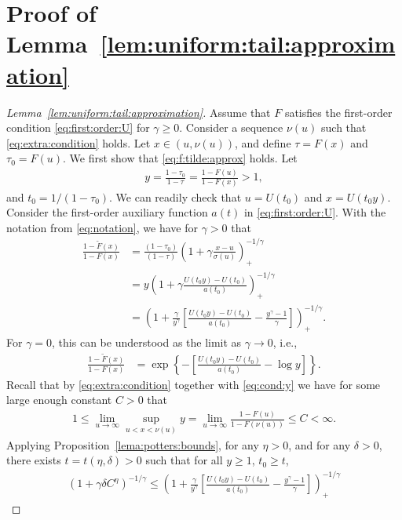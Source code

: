 \documentclass{statsoc}
\theoremstyle{break}
\newcommand{\tauzero}{\tau_0}
\newcommand{\tzero}{t_0}
\newcommand{\beam}{\begin{eqnarray}}
\newcommand{\eeam}{\end{eqnarray}\noindent}
\begin{document}
\section{Proof of Lemma~\ref{lem:uniform:tail:approximation} }\label{sec:proof:uniform:tail}	


\begin{proof}[Lemma~\ref{lem:uniform:tail:approximation}]
Assume that $F$ satisfies the first-order condition \eqref{eq:first:order:U} for $\gamma \geq  0$.
 Consider a sequence $\nu(u)$ such that \eqref{eq:extra:condition} holds.
 Let $ x\in (u,\nu(u))$, and define $\tau = F(x)$ and $\tauzero = F(u)$. We first show that \eqref{eq:f:tilde:approx} holds. Let
	\beam \label{eq:cond:y}
	y = \frac{1-\tauzero}{ 1-\tau}  = \frac{1-F(u)}{ 1-F(x) }   > 1,
	\eeam 
	and $\tzero = 1 / (1-\tauzero)$. We can readily check that $u = U(\tzero)$ and  $x = U(t_0 y)$.
	Consider the first-order auxiliary function $a(t)$ in \eqref{eq:first:order:U}. 
	With the notation from \eqref{eq:notation}, we have for $\gamma > 0$ that
	\begin{align*}
		\frac{1 - \tilde F(x) }{1-F(x)}  &=
		\frac{(1-\tauzero)}{(1-\tau)} \left(  1+  \gamma \frac{x - u }{ \sigma(u) } \right)_+^{-1/\gamma}\\
		&= y \left(  1+  \gamma \frac{ U(\tzero y) - U(\tzero)} { a(\tzero) } \right)_+^{-1/\gamma}\\
		&= \left(  1 + \frac{\gamma}{y^\gamma} \left[  \frac{ U(\tzero y) - U(\tzero)} { a(\tzero) } - \frac{y^\gamma - 1}{\gamma} \right] \right)_+^{-1/\gamma}.
 	\end{align*}
	For $\gamma = 0$, this can be understood as the limit as $\gamma \to 0$, i.e.,
	\begin{align*}
		\frac{1 - \tilde F(x) }{1-F(x)}  &= \exp \left\{- \left[  \frac{ U(\tzero y) - U(\tzero)} { a(\tzero) } - \log y \right]\right\}.
 	\end{align*}
 	Recall that by \eqref{eq:extra:condition}  together with \eqref{eq:cond:y} we have for some large enough constant $C>0$ that  
	\begin{align}\label{y_bound} 
	1 \leq \lim_{u \to \infty} \sup_{u < x < \nu(u)} y  =  \lim_{u \to \infty} \frac{1 - F(u)}{1-F(\nu(u)) } \leq C <  \infty.
	\end{align}
	Applying Proposition~\ref{lema:potters:bounds}, for any $\eta>0$, and for any $\delta >0$, there exists $t = t(\eta,\delta) > 0$ such that for all $y \geq 1$, $t_0 \geq t$, 
 	\begin{align*}
 		(1 + \gamma \delta C^{\eta} )^{-1/\gamma} 	\leq \left(  1 + \frac{\gamma}{y^\gamma} \left[  \frac{ U(\tzero y) - U(\tzero)} { a(\tzero) } - \frac{y^\gamma - 1}{\gamma} \right] \right)_+^{-1/\gamma}

\end{align*}
\end{proof}
\end{document}
